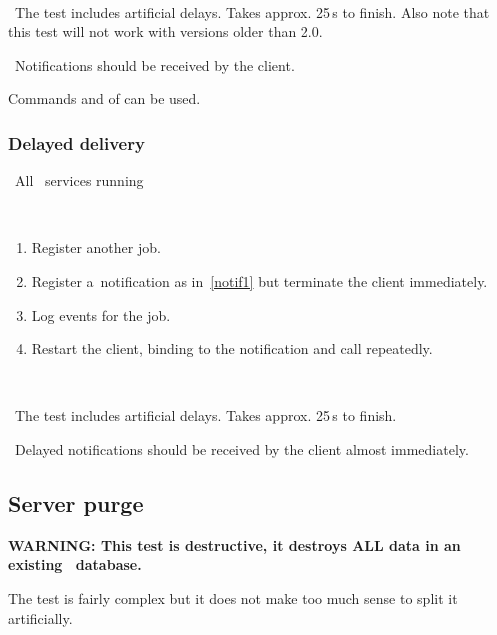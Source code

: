 \how\ 

\note\ The test includes artificial delays. Takes approx. 25\,s to finish. Also note that this test will not work with \LB versions older than 2.0.

\result\ Notifications should be received by the client.

\begin{hints}
Commands  and  of 
can be used.
\end{hints}




\subsubsection{Delayed delivery}

\req\ All \LB\ services running

\what\
\begin{enumerate}
\item Register another job.
\item Register a~notification as in~\ref{notif1} but terminate the client
immediately.
\item Log events for the job.
\item Restart the client, binding to the notification and call
 repeatedly.
\end{enumerate}

\how\ 

\note\ The test includes artificial delays. Takes approx. 25\,s to finish.

\result\ Delayed notifications should be received by the client almost
immediately.




\subsection{Server purge}

\textbf{WARNING: This test is destructive, it destroys ALL data in an
existing \LB\ database.}

The test is fairly complex but it does not make too much sense to split it
artificially.

